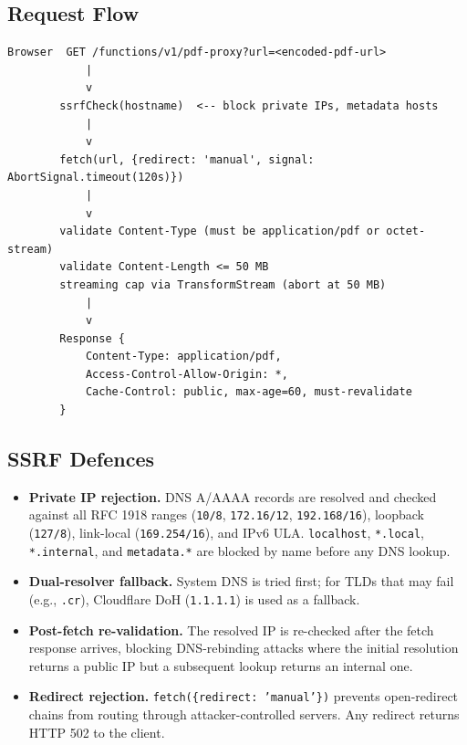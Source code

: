\documentclass[11pt,a4paper]{article}
\begin{document}
\subsection{Request Flow}

\begin{lstlisting}
Browser  GET /functions/v1/pdf-proxy?url=<encoded-pdf-url>
            |
            v
        ssrfCheck(hostname)  <-- block private IPs, metadata hosts
            |
            v
        fetch(url, {redirect: 'manual', signal: AbortSignal.timeout(120s)})
            |
            v
        validate Content-Type (must be application/pdf or octet-stream)
        validate Content-Length <= 50 MB
        streaming cap via TransformStream (abort at 50 MB)
            |
            v
        Response {
            Content-Type: application/pdf,
            Access-Control-Allow-Origin: *,
            Cache-Control: public, max-age=60, must-revalidate
        }
\end{lstlisting}

\subsection{SSRF Defences}

\begin{itemize}
  \item \textbf{Private IP rejection.} DNS A/AAAA records are resolved and checked
    against all RFC 1918 ranges (\texttt{10/8}, \texttt{172.16/12},
    \texttt{192.168/16}), loopback (\texttt{127/8}), link-local (\texttt{169.254/16}),
    and IPv6 ULA. \texttt{localhost}, \texttt{*.local}, \texttt{*.internal}, and
    \texttt{metadata.*} are blocked by name before any DNS lookup.
  \item \textbf{Dual-resolver fallback.} System DNS is tried first; for TLDs that may
    fail (e.g., \texttt{.cr}), Cloudflare DoH (\texttt{1.1.1.1}) is used as a fallback.
  \item \textbf{Post-fetch re-validation.} The resolved IP is re-checked after the fetch
    response arrives, blocking DNS-rebinding attacks where the initial resolution returns
    a public IP but a subsequent lookup returns an internal one.
  \item \textbf{Redirect rejection.} \texttt{fetch(\{redirect: 'manual'\})} prevents
    open-redirect chains from routing through attacker-controlled servers. Any redirect
    returns HTTP 502 to the client.
\end{itemize}
\end{document}
